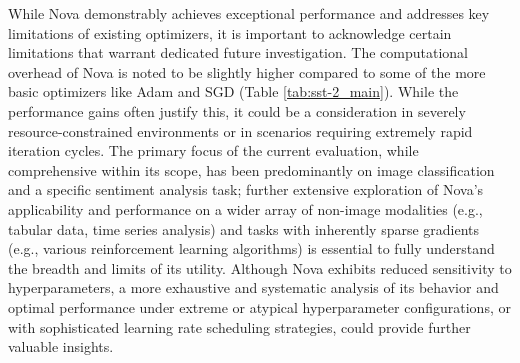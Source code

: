 \documentclass{article}
\begin{document}
While Nova demonstrably achieves exceptional performance and addresses key limitations of existing optimizers, it is important to acknowledge certain limitations that warrant dedicated future investigation. The computational overhead of Nova is noted to be slightly higher compared to some of the more basic optimizers like Adam and SGD (Table \ref{tab:sst-2_main}). While the performance gains often justify this, it could be a consideration in severely resource-constrained environments or in scenarios requiring extremely rapid iteration cycles. The primary focus of the current evaluation, while comprehensive within its scope, has been predominantly on image classification and a specific sentiment analysis task; further extensive exploration of Nova's applicability and performance on a wider array of non-image modalities (e.g., tabular data, time series analysis) and tasks with inherently sparse gradients (e.g., various reinforcement learning algorithms) is essential to fully understand the breadth and limits of its utility. Although Nova exhibits reduced sensitivity to hyperparameters, a more exhaustive and systematic analysis of its behavior and optimal performance under extreme or atypical hyperparameter configurations, or with sophisticated learning rate scheduling strategies, could provide further valuable insights.
\end{document}
